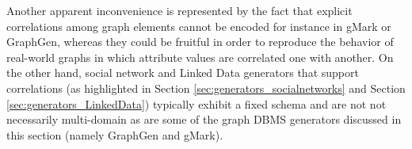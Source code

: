Another apparent inconvenience is represented by the fact that explicit correlations among graph elements cannot be encoded for instance in gMark or GraphGen, whereas they could be fruitful in order to reproduce the behavior of real-world graphs in which attribute values are correlated one with another. On the other hand, social network and Linked Data generators that support correlations (as highlighted in Section \ref{sec:generators_socialnetworks} and Section \ref{sec:generators_LinkedData}) typically exhibit a fixed schema and are not not necessarily multi-domain as are some of the graph DBMS generators discussed in this section (namely GraphGen and gMark).

